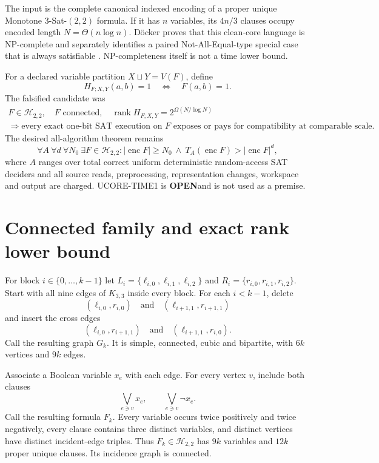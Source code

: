 \documentclass[11pt]{article}
\newcommand{\Htwo}{\mathcal H_{2,2}}
\newcommand{\OPEN}{\textbf{OPEN}}
\begin{document}
The input is the complete canonical indexed encoding of a proper unique
Monotone 3-Sat-$(2,2)$ formula.  If it has $n$ variables, its $4n/3$
clauses occupy encoded length $N=\Theta(n\log n)$.  D\"ocker proves that
this clean-core language is NP-complete and separately identifies a paired
Not-All-Equal-type special case that is always satisfiable \cite{doecker}.
NP-completeness itself is not a time lower bound.

For a declared variable partition $X\sqcup Y=V(F)$, define
\[
 H_{F;X,Y}(a,b)=1 \quad\Longleftrightarrow\quad F(a,b)=1.
\]
The falsified candidate was
\[
\tag{CONNECTEDNESS-REPAIRS-COMPAT-RANK1}
\begin{gathered}
F\in\Htwo,\quad F\text{ connected},\quad
\operatorname{rank}H_{F;X,Y}=2^{\Omega(N/\log N)}\\
\Longrightarrow
\text{every exact one-bit SAT execution on $F$ exposes or pays for
compatibility at comparable scale.}
\end{gathered}
\]
The desired all-algorithm theorem remains
\[
\tag{UCORE-TIME1}
 \forall A\ \forall d\ \forall N_0\ \exists F\in\Htwo:
 |\operatorname{enc}F|\ge N_0\ \land\
 T_A(\operatorname{enc}F)>|\operatorname{enc}F|^d,
\]
where $A$ ranges over total correct uniform deterministic random-access SAT
deciders and all source reads, preprocessing, representation changes,
workspace and output are charged.  UCORE-TIME1 is \OPEN and is not used as a
premise.

\section{Connected family and exact rank lower bound}

For block $i\in\{0,\ldots,k-1\}$ let
\(L_i=\{\ell_{i,0},\ell_{i,1},\ell_{i,2}\}\) and
\(R_i=\{r_{i,0},r_{i,1},r_{i,2}\}\).  Start with all nine edges of
$K_{3,3}$ inside every block.  For each $i<k-1$, delete
\[
 (\ell_{i,0},r_{i,0})\quad\text{and}\quad
 (\ell_{i+1,1},r_{i+1,1})
\]
and insert the cross edges
\[
 (\ell_{i,0},r_{i+1,1})\quad\text{and}\quad
 (\ell_{i+1,1},r_{i,0}).
\]
Call the resulting graph $G_k$.  It is simple, connected, cubic and
bipartite, with $6k$ vertices and $9k$ edges.

Associate a Boolean variable $x_e$ with each edge.  For every vertex $v$,
include both clauses
\[
 \bigvee_{e\ni v}x_e,
 \qquad
 \bigvee_{e\ni v}\neg x_e.
\]
Call the resulting formula $F_k$.  Every variable occurs twice positively
and twice negatively, every clause contains three distinct variables, and
distinct vertices have distinct incident-edge triples.  Thus $F_k\in\Htwo$
has $9k$ variables and $12k$ proper unique clauses.  Its incidence graph is
connected.
\end{document}
